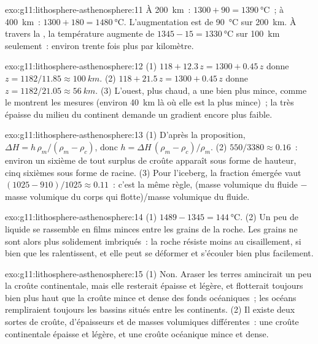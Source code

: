 \begin{solution}{exo:g11:lithosphere-asthenosphere:11}
À \qty{200}{km}~: $1300 + 90 = \qty{1390}{\celsius}$~; à \qty{400}{km}~:
$1300 + 180 = \qty{1480}{\celsius}$. L'augmentation est de
\qty{90}{\celsius} sur \qty{200}{km}. À travers la , la
température augmente de
$1345 - 15 = \qty{1330}{\celsius}$ sur \qty{100}{km} seulement~: environ
trente fois plus par kilomètre.
\end{solution}

\begin{solution}{exo:g11:lithosphere-asthenosphere:12}
(1) $118 + 12.3\,z = 1300 + 0.45\,z$ donne $z = 1182/11.85 \approx
\qty{100}{km}$. (2) $118 + 21.5\,z = 1300 + 0.45\,z$ donne $z = 1182/21.05
\approx \qty{56}{km}$. (3) L'ouest, plus chaud, a une  bien plus
mince, comme le montrent les mesures (environ \qty{40}{km} là où elle est la
plus mince)~; la  très épaisse du milieu du continent demande un
gradient encore plus faible.
\end{solution}

\begin{solution}{exo:g11:lithosphere-asthenosphere:13}
(1) D'après la proposition, $\Delta H = h\,\rho_m/(\rho_m - \rho_c)$, donc $h =
\Delta H\,(\rho_m - \rho_c)/\rho_m$. (2) $550/3380 \approx 0.16$~: environ un
sixième de tout surplus de croûte apparaît sous forme de hauteur, cinq
sixièmes sous forme de racine. (3) Pour l'iceberg, la fraction émergée vaut
$(1025 - 910)/1025 \approx 0.11$~: c'est la même règle, (masse volumique du
fluide $-$ masse volumique du corps qui flotte)/masse volumique du fluide.
\end{solution}

\begin{solution}{exo:g11:lithosphere-asthenosphere:14}
(1) $1489 - 1345 = \qty{144}{\celsius}$. (2) Un peu de liquide se rassemble
en films minces entre les grains de la roche. Les grains ne sont alors plus
solidement imbriqués~: la roche résiste moins au cisaillement, si bien que
les  ralentissent, et elle peut se déformer et s'écouler bien plus
facilement.
\end{solution}

\begin{solution}{exo:g11:lithosphere-asthenosphere:15}
(1) Non. Araser les terres amincirait un peu la croûte continentale, mais
elle resterait épaisse et légère, et flotterait toujours bien plus haut que
la croûte mince et dense des fonds océaniques~; les océans rempliraient
toujours les bassins situés entre les continents. (2) Il existe deux sortes
de croûte, d'épaisseurs et de masses volumiques différentes~: une croûte
continentale épaisse et légère, et une croûte océanique mince et dense.
\end{solution}


